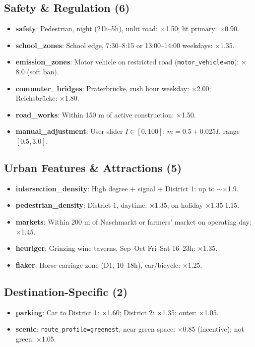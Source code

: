 \documentclass[11pt,a4paper]{article}
\begin{document}
\subsection{Safety \& Regulation (6)}
\begin{itemize}[noitemsep]
  \item \textbf{safety}: Pedestrian, night (21h–5h), unlit road: $\times$1.50; lit primary: $\times$0.90.
  \item \textbf{school\_zones}: School edge, 7:30–8:15 or 13:00–14:00 weekdays: $\times$1.35.
  \item \textbf{emission\_zones}: Motor vehicle on restricted road (\texttt{motor\_vehicle=no}): $\times$8.0 (soft ban).
  \item \textbf{commuter\_bridges}: Praterbrücke, rush hour weekday: $\times$2.00; Reichsbrücke: $\times$1.80.
  \item \textbf{road\_works}: Within 150 m of active construction: $\times$1.50.
  \item \textbf{manual\_adjustment}: User slider $I\in[0,100]$: $m = 0.5 + 0.025I$, range $[0.5, 3.0]$.
\end{itemize}

\subsection{Urban Features \& Attractions (5)}
\begin{itemize}[noitemsep]
  \item \textbf{intersection\_density}: High degree + signal + District 1: up to $\sim\times$1.9.
  \item \textbf{pedestrian\_density}: District 1, daytime: $\times$1.35; on holiday $\times$1.35$\cdot$1.15.
  \item \textbf{markets}: Within 200 m of Naschmarkt or farmers' market on operating day: $\times$1.45.
  \item \textbf{heuriger}: Grinzing wine taverns, Sep–Oct Fri–Sat 16–23h: $\times$1.35.
  \item \textbf{fiaker}: Horse-carriage zone (D1, 10–18h), car/bicycle: $\times$1.25.
\end{itemize}

\subsection{Destination-Specific (2)}
\begin{itemize}[noitemsep]
  \item \textbf{parking}: Car to District 1: $\times$1.60; District 2: $\times$1.35; outer: $\times$1.05.
  \item \textbf{scenic}: \texttt{route\_profile=greenest}, near green space: $\times$0.85 (incentive); not green: $\times$1.05.
\end{itemize}
\end{document}
